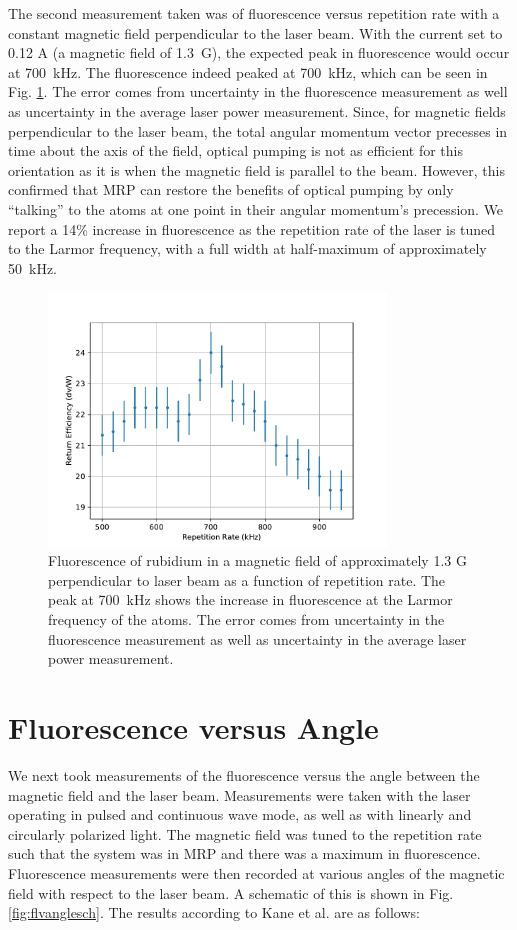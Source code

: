 The second measurement taken was of fluorescence versus repetition rate with a constant magnetic field perpendicular to the laser beam. With the current set to 0.12 A (a magnetic field of \SI{1.3}{ G}), the expected peak in fluorescence would occur at \SI{700}{ kHz}. The fluorescence indeed peaked at \SI{700}{ kHz}, which can be seen in Fig. \ref{fig:flvrep}. The error comes from uncertainty in the fluorescence measurement as well as uncertainty in the average laser power measurement. Since, for magnetic fields perpendicular to the laser beam, the total angular momentum vector precesses in time about the axis of the field, optical pumping is not as efficient for this orientation as it is when the magnetic field is parallel to the beam. However, this confirmed that MRP can restore the benefits of optical pumping by only ``talking'' to the atoms at one point in their angular momentum's precession. We report a 14\% increase in fluorescence as the repetition rate of the laser is tuned to the Larmor frequency, with a full width at half-maximum of approximately \SI{50}{ kHz}.

\begin{figure}[ht]
	\centering
	\includegraphics[width=0.8\textwidth]{../../MRPData/MAR24/FLvRep.pdf}
	\caption{Fluorescence of rubidium in a magnetic field of approximately 1.3 G perpendicular to laser beam as a function of repetition rate. The peak at \SI{700}{ kHz} shows the increase in fluorescence at the Larmor frequency of the atoms. The error comes from uncertainty in the fluorescence measurement as well as uncertainty in the average laser power measurement.}
	\label{fig:flvrep}
\end{figure}


\section{Fluorescence versus Angle}
We next took measurements of the fluorescence versus the angle between the magnetic field and the laser beam. Measurements were taken with the laser operating in pulsed and continuous wave mode, as well as with linearly and circularly polarized light. The magnetic field was tuned to the repetition rate such that the system was in MRP and there was a maximum in fluorescence. Fluorescence measurements were then recorded at various angles of the magnetic field with respect to the laser beam. A schematic of this is shown in Fig. \ref{fig:flvanglesch}. The results according to Kane et al. \cite{Kane2014} are as follows:

